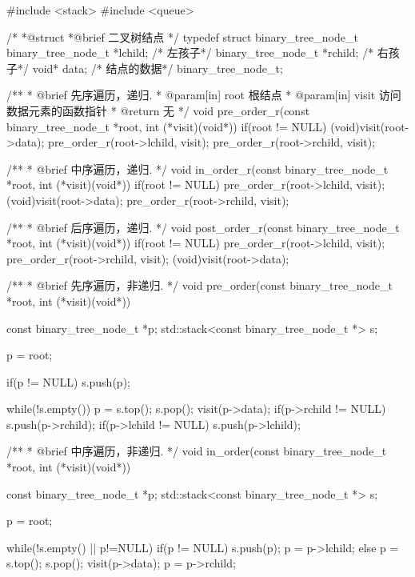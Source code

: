 \begin{Codex}[label=binary_tree.cpp]
#include <stack>
#include <queue>

 /*
  *@struct
  *@brief 二叉树结点
  */
typedef struct binary_tree_node_t {
    binary_tree_node_t *lchild;   /* 左孩子*/
    binary_tree_node_t *rchild;   /* 右孩子*/
    void* data; /* 结点的数据*/
}binary_tree_node_t;

/** 
  * @brief 先序遍历，递归.
  * @param[in] root 根结点
  * @param[in] visit 访问数据元素的函数指针
  * @return 无
  */
void pre_order_r(const binary_tree_node_t *root, 
                 int (*visit)(void*)) {
    if(root != NULL) {
        (void)visit(root->data);
        pre_order_r(root->lchild, visit);
        pre_order_r(root->rchild, visit);
    }
}

/** 
  * @brief 中序遍历，递归.
  */
void in_order_r(const binary_tree_node_t *root, 
                int (*visit)(void*)) {
    if(root != NULL) {
        pre_order_r(root->lchild, visit);
        (void)visit(root->data);
        pre_order_r(root->rchild, visit);
    }
}

/** 
  * @brief 后序遍历，递归.
  */
void post_order_r(const binary_tree_node_t *root, 
                  int (*visit)(void*)) {
    if(root != NULL) {
        pre_order_r(root->lchild, visit);
        pre_order_r(root->rchild, visit);
        (void)visit(root->data);
    }
}

/** 
 * @brief 先序遍历，非递归.
 */
void pre_order(const binary_tree_node_t *root, 
               int (*visit)(void*)) {
    const binary_tree_node_t *p;
    std::stack<const binary_tree_node_t *> s;

    p = root;

    if(p != NULL) {
        s.push(p);
    }

    while(!s.empty()) {
        p = s.top();
        s.pop();
        visit(p->data);
        if(p->rchild != NULL) {
            s.push(p->rchild);
        }
        if(p->lchild != NULL) {
            s.push(p->lchild);
        }
    }
}

/** 
 * @brief 中序遍历，非递归.
 */
void in_order(const binary_tree_node_t *root, 
              int (*visit)(void*)) {
    const binary_tree_node_t *p;
    std::stack<const binary_tree_node_t *> s;

    p = root;

    while(!s.empty() || p!=NULL) {
        if(p != NULL) {
            s.push(p);
            p = p->lchild;
        } else {
            p = s.top();
            s.pop();
            visit(p->data);
            p = p->rchild;
        }
    }
}


\end{Codex}
